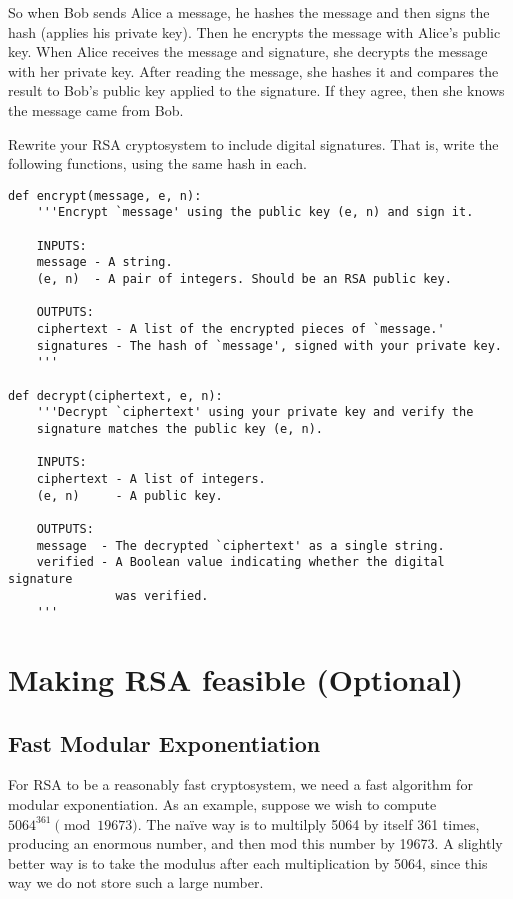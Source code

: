 So when Bob sends Alice a message, he hashes the message and then signs the hash (applies his private key).
Then he encrypts the message with Alice's public key. 
When Alice receives the message and signature, she decrypts the message with her private key.
After reading the message, she hashes it and compares the result to Bob's public key applied to the signature.
If they agree, then she knows the message came from Bob.

\begin{problem}
Rewrite your RSA cryptosystem to include digital signatures. 
That is, write the following functions, using the same hash in each.
\begin{lstlisting}
def encrypt(message, e, n):
    '''Encrypt `message' using the public key (e, n) and sign it.
    
    INPUTS:
    message - A string.
    (e, n)  - A pair of integers. Should be an RSA public key.
    
    OUTPUTS:
    ciphertext - A list of the encrypted pieces of `message.'
    signatures - The hash of `message', signed with your private key.
    '''
    
def decrypt(ciphertext, e, n):
    '''Decrypt `ciphertext' using your private key and verify the 
    signature matches the public key (e, n).
    
    INPUTS:
    ciphertext - A list of integers.
    (e, n)     - A public key.
    
    OUTPUTS:
    message  - The decrypted `ciphertext' as a single string.
    verified - A Boolean value indicating whether the digital signature 
               was verified.
    '''
\end{lstlisting}
\end{problem}




















\section*{Making RSA feasible (Optional)}

\subsection*{Fast Modular Exponentiation}
For RSA to be a reasonably fast cryptosystem, we need a fast algorithm for modular exponentiation.
As an example, suppose we wish to compute $5064^{361} \pmod{19673}.$
The na\"ive way is to multilply 5064 by itself 361 times, producing an enormous number, and then mod this number by 19673.
A slightly better way is to take the modulus after each multiplication by 5064, since this way we do not store such a large number.

